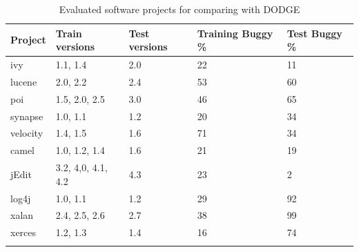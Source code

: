 \documentclass[10pt,compsoc,twocolumn]{IEEEtran}
\begin{document}
\begin{table} 
    \centering
    \caption{Evaluated software projects for comparing with DODGE \cite{agrawal2019dodge}}
    \begin{tabularx}{\linewidth}{lllLL}
        \toprule
        Project & Train versions & Test versions & Training Buggy \% & Test  Buggy \% \\
        \midrule
        ivy & 1.1, 1.4 & 2.0 & 22 & 11 \\
         lucene & 2.0, 2.2 & 2.4 & 53 & 60 \\
        poi & 1.5, 2.0, 2.5 & 3.0 & 46 & 65 \\
        synapse & 1.0, 1.1 & 1.2 & 20 & 34 \\
        velocity & 1.4, 1.5 & 1.6 & 71 & 34 \\
        camel & 1.0, 1.2, 1.4 & 1.6 & 21 & 19 \\
        jEdit & 3.2, 4,0, 4.1, 4.2 & 4.3 & 23 & 2 \\
        log4j & 1.0, 1.1 & 1.2 & 29 & 92 \\
        xalan & 2.4, 2.5, 2.6 & 2.7 & 38 & 99 \\
        xerces & 1.2, 1.3 & 1.4 & 16 & 74 \\
        \bottomrule \\
    \end{tabularx}
    \label{tab:datasets}
\end{table}
\end{document}
